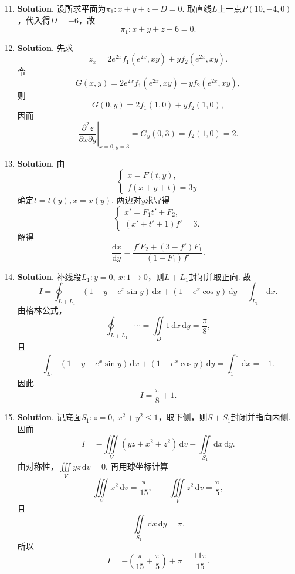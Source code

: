 \documentclass[../Main.tex]{subfiles}
\begin{document}
\begin{enumerate}
    \setcounter{enumi}{10}
    \item \textbf{Solution}. 设所求平面为$\pi_{1}:x+y+z+D=0$.
          取直线$L$上一点$P(10,-4,0)$，代入得$D=-6$，故
          \[
              \pi_{1}:x+y+z-6=0.
          \]

    \item \textbf{Solution}. 先求
          \[
              z_{x}=2e^{2x}f_{1}(e^{2x},xy)+yf_{2}(e^{2x},xy).
          \]
          令
          \[
              G(x,y)=2e^{2x}f_{1}(e^{2x},xy)+yf_{2}(e^{2x},xy),
          \]
          则
          \[
              G(0,y)=2f_{1}(1,0)+yf_{2}(1,0),
          \]
          因而
          \[
              \left.\frac{\partial^{2}z}{\partial x\partial y}\right|_{x=0,y=3}=G_{y}(0,3)=f_{2}(1,0)=2.
          \]

    \item \textbf{Solution}. 由
          \[
              \begin{cases}
                  x=F(t,y), \\
                  f(x+y+t)=3y
              \end{cases}
          \]
          确定$t=t(y),x=x(y)$.
          两边对$y$求导得
          \[
              \begin{cases}
                  x'=F_{1}t'+F_{2}, \\
                  (x'+t'+1)f'=3.
              \end{cases}
          \]
          解得
          \[
              \frac{\mathrm{d}x}{\mathrm{d}y}=\frac{f'F_{2}+(3-f')F_{1}}{(1+F_{1})f'}.
          \]

    \item \textbf{Solution}. 补线段$L_{1}:y=0,\ x:1\to0$，则$L+L_{1}$封闭并取正向.
          故
          \[
              I=\oint_{L+L_{1}}(1-y-e^{x}\sin y)\,\mathrm{d}x+(1-e^{x}\cos y)\,\mathrm{d}y-\int_{L_{1}}\,\mathrm{d}x.
          \]
          由格林公式，
          \[
              \oint_{L+L_{1}}\cdots=\iint\limits_{D}1\,\mathrm{d}x\,\mathrm{d}y=\frac{\pi}{8},
          \]
          且
          \[
              \int_{L_{1}}(1-y-e^{x}\sin y)\,\mathrm{d}x+(1-e^{x}\cos y)\,\mathrm{d}y=\int_{1}^{0}\,\mathrm{d}x=-1.
          \]
          因此
          \[
              I=\frac{\pi}{8}+1.
          \]

    \item \textbf{Solution}. 记底面$S_{1}:z=0,\ x^{2}+y^{2}\leq1$，取下侧，则$S+S_{1}$封闭并指向内侧.
          因而
          \[
              I=-\iiint\limits_{V}(yz+x^{2}+z^{2})\,\mathrm{d}v-\iint\limits_{S_{1}}\,\mathrm{d}x\,\mathrm{d}y.
          \]
          由对称性，$\iiint\limits_{V}yz\,\mathrm{d}v=0$.
          再用球坐标计算
          \[
              \iiint\limits_{V}x^{2}\,\mathrm{d}v=\frac{\pi}{15},\qquad \iiint\limits_{V}z^{2}\,\mathrm{d}v=\frac{\pi}{5},
          \]
          且
          \[
              \iint\limits_{S_{1}}\,\mathrm{d}x\,\mathrm{d}y=\pi.
          \]
          所以
          \[
              I=-\left(\frac{\pi}{15}+\frac{\pi}{5}\right)+\pi=\frac{11\pi}{15}.
          \]


\end{enumerate}
\end{document}
